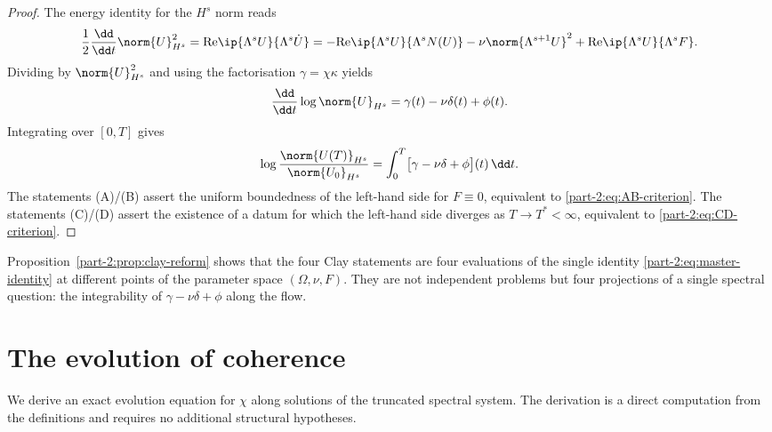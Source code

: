 \begin{proof}
The energy identity for the $H^s$ norm reads
\begin{equation*}
\frac{1}{2}\frac{\dd}{\dd t}\norm{U}_{H^s}^2 
= \mathrm{Re}\ip{\Lambda^s U}{\Lambda^s \dot U}
= -\mathrm{Re}\ip{\Lambda^s U}{\Lambda^s N(U)}
- \nu\norm{\Lambda^{s+1}U}^2 
+ \mathrm{Re}\ip{\Lambda^s U}{\Lambda^s F}.
\end{equation*}
Dividing by $\norm{U}_{H^s}^2$ and using the factorisation 
$\gamma = \chi\kappa$ yields
\begin{equation}\label{part-2:eq:master-identity}
\frac{\dd}{\dd t}\log\norm{U}_{H^s} = \gamma(t) - \nu\delta(t) + \phi(t).
\end{equation}
Integrating over $[0,T]$ gives
\begin{equation*}
\log\frac{\norm{U(T)}_{H^s}}{\norm{U_0}_{H^s}} 
= \int_0^T \bigl[\gamma - \nu\delta + \phi\bigr](t)\,\dd t.
\end{equation*}
The statements (A)/(B) assert the uniform boundedness of the left-hand 
side for $F\equiv 0$, equivalent to \eqref{part-2:eq:AB-criterion}. The 
statements (C)/(D) assert the existence of a datum for which the 
left-hand side diverges as $T\to T^\ast<\infty$, equivalent to 
\eqref{part-2:eq:CD-criterion}.
\end{proof}

\begin{remark}[Unification]\label{part-2:rem:unification}
Proposition~\ref{part-2:prop:clay-reform} shows that the four Clay statements 
are four evaluations of the single identity \eqref{part-2:eq:master-identity} 
at different points of the parameter space $(\Omega,\nu,F)$. They are 
not independent problems but four projections of a single spectral 
question: the integrability of $\gamma - \nu\delta + \phi$ along the 
flow.
\end{remark}

\section{The evolution of coherence}
\label{part-2:sec:coherence-eq}

We derive an exact evolution equation for $\chi$ along solutions of the 
truncated spectral system. The derivation is a direct computation from 
the definitions and requires no additional structural hypotheses.

